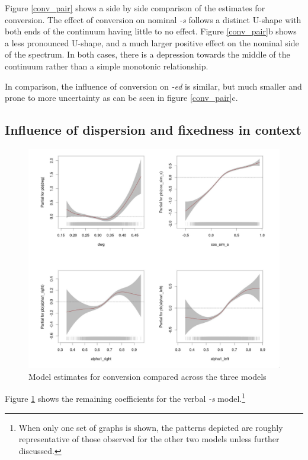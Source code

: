 \documentclass[
]{article}
\begin{document}
Figure \ref{conv_pair} shows a side by side comparison of the estimates
for conversion. The effect of conversion on nominal \emph{-s} follows a
distinct U-shape with both ends of the continuum having little to no
effect. Figure \ref{conv_pair}b shows a less pronounced U-shape, and a
much larger positive effect on the nominal side of the spectrum. In both
cases, there is a depression towards the middle of the continuum rather
than a simple monotonic relationship.

In comparison, the influence of conversion on \emph{-ed} is similar, but
much smaller and prone to more uncertainty as can be seen in figure
\ref{conv_pair}c.

\hypertarget{influence-of-dispersion-and-fixedness-in-context}{%
\subsection{Influence of dispersion and fixedness in
context}\label{influence-of-dispersion-and-fixedness-in-context}}

\begin{figure}[t!]
    \centering
    \includegraphics[width=\textwidth]{figures/docx_subfigures_2.png}
    \caption{Model estimates for conversion compared across the three models}
    \label{other_coefs_verb}
\end{figure}

Figure \ref{other_coefs_verb} shows the remaining coefficients for the
verbal \emph{-s} model.\footnote{When only one set of graphs is shown,
  the patterns depicted are roughly representative of those observed for
  the other two models unless further discussed.}
\end{document}
